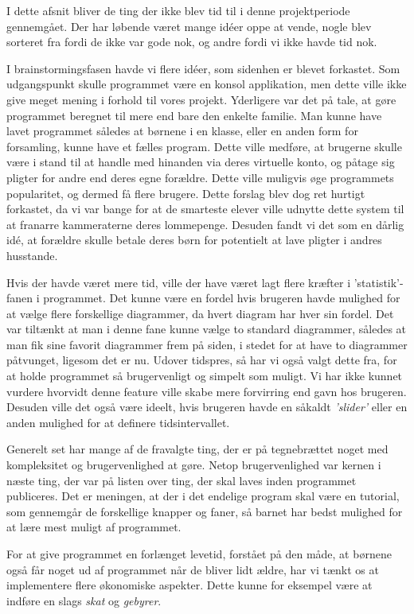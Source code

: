 I dette afsnit bliver de ting der ikke blev tid til i denne projektperiode gennemgået. Der har løbende været mange idéer oppe at vende, nogle blev sorteret fra fordi de ikke var gode nok, og andre fordi vi ikke havde tid nok. 

I brainstormingsfasen havde vi flere idéer, som sidenhen er blevet forkastet. Som udgangspunkt skulle programmet være en konsol applikation, men dette ville ikke give meget mening i forhold til vores projekt. Yderligere var det på tale, at gøre programmet beregnet til mere end bare den enkelte familie. Man kunne have lavet programmet således at børnene i en klasse, eller en anden form for forsamling, kunne have et fælles program. Dette ville medføre, at brugerne skulle være i stand til at handle med hinanden via deres virtuelle konto, og påtage sig pligter for andre end deres egne forældre. Dette ville muligvis øge programmets popularitet, og dermed få flere brugere. Dette forslag blev dog ret hurtigt forkastet, da vi var bange for at de smarteste elever ville udnytte dette system til at franarre kammeraterne deres lommepenge. Desuden fandt vi det som en dårlig idé, at forældre skulle betale deres børn for potentielt at lave pligter i andres husstande.

Hvis der havde været mere tid, ville der have været lagt flere kræfter i 'statistik'-fanen i programmet. Det kunne være en fordel hvis brugeren havde mulighed for at vælge flere forskellige diagrammer, da hvert diagram har hver sin fordel. Det var tiltænkt at man i denne fane kunne vælge to standard diagrammer, således at man fik sine favorit diagrammer frem på siden, i stedet for at have to diagrammer påtvunget, ligesom det er nu. Udover tidspres, så har vi også valgt dette fra, for at holde programmet så brugervenligt og simpelt som muligt. Vi har ikke kunnet vurdere hvorvidt denne feature ville skabe mere forvirring end gavn hos brugeren. Desuden ville det også være ideelt, hvis brugeren havde en såkaldt \textit{'slider'} eller en anden mulighed for at definere tidsintervallet.

Generelt set har mange af de fravalgte ting, der er på tegnebrættet noget med kompleksitet og brugervenlighed at gøre. Netop brugervenlighed var kernen i næste ting, der var på listen over ting, der skal laves inden programmet publiceres. Det er meningen, at der i det endelige program skal være en tutorial, som gennemgår de forskellige knapper og faner, så barnet har bedst mulighed for at lære mest muligt af programmet.

For at give programmet en forlænget levetid, forstået på den måde, at børnene også får noget ud af programmet når de bliver lidt ældre, har vi tænkt os at implementere flere økonomiske aspekter. Dette kunne for eksempel være at indføre en slags \textit{skat} og \textit{gebyrer}.

